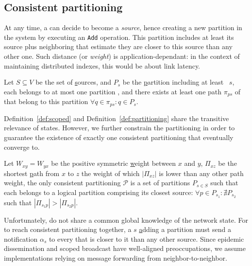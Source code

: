 

\subsection{Consistent partitioning}
\label{subsec:consistent}

At any time, a \process can decide to become a \emph{source}, hence
creating a new partition in the system by executing an \texttt{Add}
operation. This partition includes at least its source plus
neighboring \processes that estimate they are closer to this source
than any other one. Such distance (or \emph{weight}) is
application-dependant: in the context of maintaining distributed
indexes, this would be about link latency.

\begin{definition}
  Let $S \subseteq V$ be the set of \underline{s}ources, and $P_s$ be
  the \underline{p}artition including at least \Process~$s$, each
  \process belongs to at most one partition , and there exists at least one path $\pi_{ps}$ of
  \processes that belong to this partition $\forall q \in \pi_{ps}: q
  \in P_s$.
\end{definition}

Definition~\ref{def:scoped} and Definition~\ref{def:partitioning}
share the transitive relevance of \process states. However, we further
constrain the partitioning in order to guarantee the existence of
exactly one consistent partitioning that \processes eventually converge
to.

\begin{definition}
  Let $W_{xy} = W_{yx}$ be the positive symmetric \underline{w}eight
  between $x$ and $y$, $\Pi_{xz}$ be the shortest \underline{p}ath
  from $x$ to $z$ the weight of which $|\Pi_{xz}|$ is lower than any
  other path weight, the only consistent partitioning $\mathcal{P}$ is
  a set of partitions $P_{s\in S}$ such that each \process belongs to
  a logical partition comprising its closest source: $\forall p \in
  P_{s_1}: \nexists P_{s_2}$ such that $|\Pi_{s_1p}| > |\Pi_{s_2p}|$.
\end{definition}

Unfortunately, \processes do not share a common global knowledge of
the network state. For \processes to reach consistent partitioning
together, a \Process $s$ \underline{a}dding a partition must send a
notification $\alpha_s$ to every \process that is closer to it than
any other source. Since epidemic dissemination and scoped broadcast
have well-aligned preoccupations, we assume implementations relying on
message forwarding from neighbor-to-neighbor.

